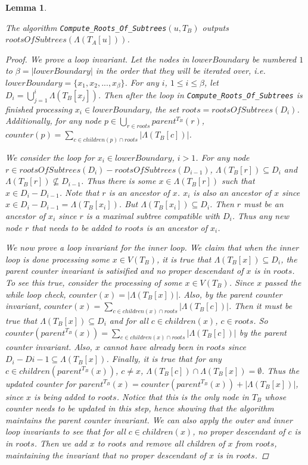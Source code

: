 \documentclass{article}
\newcommand{\leafset}{\Lambda}
\newtheorem{computerootsofsubtreescorrectness}[incompatibility]{Lemma}
\begin{document}
    \begin{computerootsofsubtreescorrectness}
        \label{lem:computerootsofsubtreescorrectness}

        The algorithm \texttt{Compute\_Roots\_Of\_Subtrees}$(u, T_B)$ outputs $rootsOfSubtrees(\leafset(T_A[u]))$.

        \begin{proof}
            We prove a loop invariant. Let the nodes in $lowerBoundary$ be numbered $1$ to $\beta = |lowerBoundary|$ in the order that they will be iterated over, i.e. $lowerBoundary = \{x_1, x_2, ..., x_{\beta}\}$. For any $i$, $1 \leq i \leq \beta$, let $D_i = \bigcup_{j = 1}^{i} \leafset(T_B[x_j])$. Then after the loop in \texttt{Compute\_Roots\_Of\_Subtrees} is finished processing $x_i \in lowerBoundary$, the set $roots = rootsOfSubtrees(D_i)$. Additionally, for any node $p \in \bigcup_{r \in roots} parent^{T_B}(r)$, $counter(p) = \sum_{c \in children(p) \cap roots} |\leafset(T_B[c])|$.

            We consider the loop for $x_i \in lowerBoundary$, $i > 1$. For any node $r \in rootsOfSubtrees(D_i) - rootsOfSubtrees(D_{i-1})$, $\leafset(T_B[r]) \subseteq D_i$ and $\leafset(T_B[r]) \not\subseteq D_{i-1}$. Thus there is some $x \in \leafset(T_B[r])$ such that $x \in D_i - D_{i-1}$. Note that $r$ is an ancestor of $x$. $x_i$ is also an ancestor of $x$ since $x \in D_i - D_{i-1} = \leafset(T_B[x_i])$. But $\leafset(T_B[x_i]) \subseteq D_i$. Then $r$ must be an ancestor of $x_i$ since $r$ is a maximal subtree compatible with $D_i$. Thus any new node $r$ that needs to be added to $roots$ is an ancestor of $x_i$.

            We now prove a loop invariant for the inner loop. We claim that when the inner loop is done processing some $x \in V(T_B)$, it is true that $\leafset(T_B[x]) \subseteq D_i$, the parent counter invariant is satisified and no proper descendant of $x$ is in $roots$. To see this true, consider the processing of some $x \in V(T_B)$. Since $x$ passed the while loop check, $counter(x) = |\leafset(T_B[x])|$. Also, by the parent counter invariant, $counter(x) = \sum_{c \in children(x) \cap roots} |\leafset(T_B[c])|$. Then it must be true that $\leafset(T_B[x]) \subseteq D_i$ and for all $c \in children(x)$, $c \in roots$. So $counter(parent^{T_B}(x)) = \sum_{c \in children(x) \cap roots} |\leafset(T_B[c])|$ by the parent counter invariant. Also, $x$ cannot have already been in $roots$ since $D_i - D{i-1} \subseteq \leafset(T_B[x])$. Finally, it is true that for any $c \in children(parent^{T_B}(x))$, $c \neq x$, $\leafset(T_B[c]) \cap \leafset(T_B[x]) = \emptyset$. Thus the updated counter for $parent^{T_B}(x) = counter(parent^{T_B}(x)) + |\leafset(T_B[x])|$, since $x$ is being added to $roots$. Notice that this is the only node in $T_B$ whose counter needs to be updated in this step, hence showing that the algorithm maintains the parent counter invariant. We can also apply the outer and inner loop invariants to see that for all $c \in children(x)$, no proper descendant of $c$ is in $roots$. Then we add $x$ to $roots$ and remove all children of $x$ from $roots$, maintaining the invariant that no proper descendant of $x$ is in $roots$.


\end{proof}
\end{computerootsofsubtreescorrectness}
\end{document}
